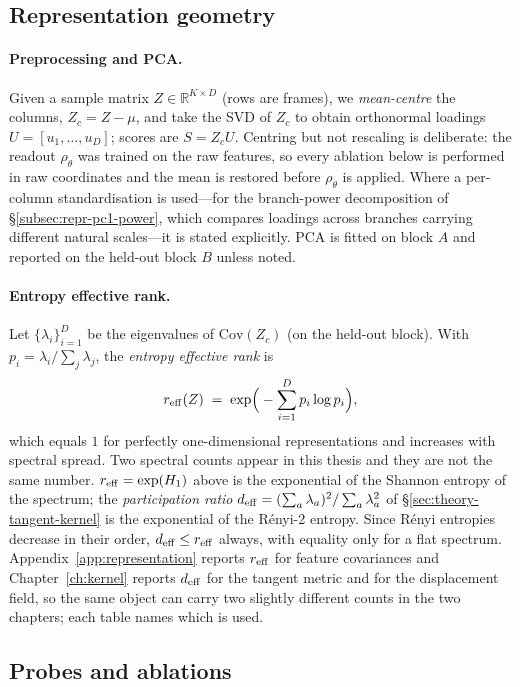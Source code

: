 \subsection{Representation geometry}
\paragraph{Preprocessing and PCA.}
\label{subsec:repr-prep}
Given a sample matrix $Z\in\mathbb{R}^{K\times D}$ (rows are frames), we \emph{mean-centre}
the columns, $Z_c=Z-\mu$, and take the SVD of $Z_c$ to obtain orthonormal loadings
$U=[u_1,\dots,u_D]$; scores are $S=Z_cU$. Centring but not rescaling is deliberate: the
readout $\rho_\theta$ was trained on the raw features, so every ablation below is performed
in raw coordinates and the mean is restored before $\rho_\theta$ is applied. Where a
per-column standardisation is used---for the branch-power decomposition of
\S\ref{subsec:repr-pc1-power}, which compares loadings across branches carrying different
natural scales---it is stated explicitly. PCA is fitted on block $A$ and reported on the
held-out block $B$ unless noted.

\paragraph{Entropy effective rank.}
\label{subsec:repr-erank}
Let $\{\lambda_i\}_{i=1}^D$ be the eigenvalues of $\mathrm{Cov}(Z_c)$
(on the held-out block). With $p_i=\lambda_i/\sum_j\lambda_j$, the
\emph{entropy effective rank} is
\[
r_{\rm eff}(Z)\;=\;\exp\!\Big(-\sum_{i=1}^D p_i\log p_i\Big),
\]
which equals $1$ for perfectly one-dimensional representations and increases
with spectral spread. Two spectral counts appear in this thesis and they are not the same
number. $r_{\rm eff}=\exp(H_1)$ above is the exponential of the Shannon entropy of the
spectrum; the \emph{participation ratio}
$d_{\rm eff}=(\sum_a\lambda_a)^2/\sum_a\lambda_a^2$ of \S\ref{sec:theory-tangent-kernel} is
the exponential of the R\'enyi-2 entropy. Since R\'enyi entropies decrease in their order,
$d_{\rm eff}\le r_{\rm eff}$ always, with equality only for a flat spectrum. Appendix~\ref{app:representation}
reports $r_{\rm eff}$ for feature covariances and Chapter~\ref{ch:kernel}
reports $d_{\rm eff}$ for the tangent metric and for the displacement field, so the same
object can carry two slightly different counts in the two chapters; each table names which
is used.

\subsection{Probes and ablations}
